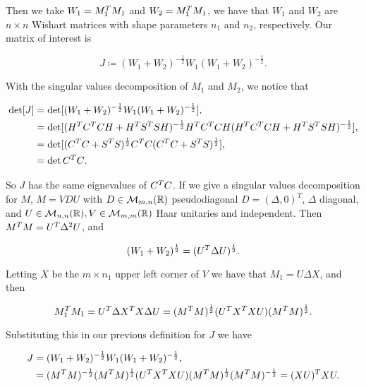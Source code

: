 Then we take $W_1 = M_1^TM_1$ and $W_2 = M_1^TM_1$, we have that $W_1$ and $W_2$ are $n\times n$ Wishart matrices with shape parameters $n_1$ and $n_2$, respectively. Our matrix of interest is

\begin{equation*}
    J \coloneqq (W_1 + W_2)^{-\frac12} W_1 (W_1 + W_2)^{-\frac12}.
\end{equation*}

    With the singular values decomposition of $M_1$ and $M_2$, we notice that 

\begin{align*}
    \det[J] &= \det[(W_1 + W_2)^{-\frac12} W_1 (W_1 + W_2)^{-\frac12}],\\ 
    &= \det[(H^T C^T C H + H^T S^TS H)^{-\frac12}H^T C^T C H(H^T C^T C H + H^T S^TS H)^{-\frac12}],\\
    &= \det[(C^T C + S^T S)^{\frac12}C^TC (C^T C + S^T S)^{\frac12}],\\
    &= \det{C^TC}.
\end{align*}

So $J$ has the same eignevalues of $C^TC$. If we give a singular values decomposition for $M$, $M = VDU$ with $D \in \mathcal M_{m,n}(\mathbb R)$ pseudodiagonal $D = (\Delta, 0)^T$, $\Delta$ diagonal, and $U \in \mathcal M_{n,n}(\mathbb R),V \in \mathcal M_{m,m}(\mathbb R)$ Haar unitaries and independent. Then $M^T M = U^T \Delta^2 U$, and

\begin{equation*}
    (W_1 + W_2)^{\frac12} = (U^T \Delta U)^{\frac12}.
\end{equation*}

Letting $X$ be the $m\times n_1$ upper left corner of $V$ we have that $M_1 = U\Delta X$, and then

\begin{equation*}
    M_1^TM_1 = U^T \Delta X^T X \Delta U = (M^T M)^{\frac12} (U^T X^T X U)  (M^T M)^{\frac12}.
\end{equation*}

Substituting this in our previous definition for $J$ we have

\begin{align*}
    J &= (W_1 + W_2)^{-\frac12} W_1 (W_1 + W_2)^{-\frac12},\\ &= (M^T M)^{-\frac12} (M^T M)^{\frac12} (U^T X^T X U)  (M^T M)^{\frac12} (M^T M)^{-\frac12} = (XU)^TXU.
\end{align*}

